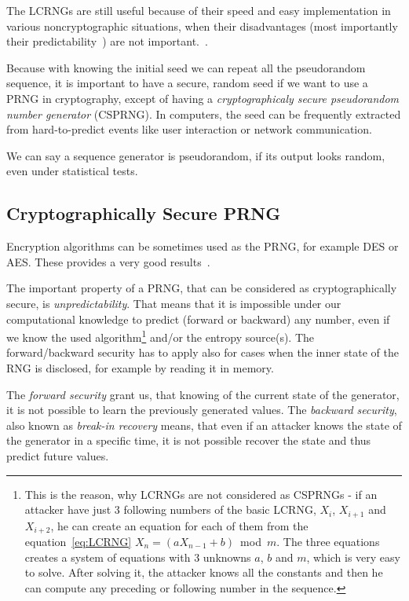The LCRNGs are still useful because of their speed and easy implementation in various noncryptographic situations, when their disadvantages (most importantly their predictability~\cite[p.~152, 153]{CryptographyAndNetworkSecurity}) are not important.~\cite[chapter~16.1]{AppliedCryptography}. 

Because with knowing the initial seed we can repeat all the pseudorandom sequence, it is important to have a secure, random seed if we want to use a PRNG in cryptography, except of having a {\em cryptographicaly secure pseudorandom number generator} (CSPRNG). In computers, the seed can be frequently extracted from hard-to-predict events like user interaction or network communication.

We can say a sequence generator is pseudorandom, if its output looks random, even under statistical tests.

\subsection{Cryptographically Secure PRNG}
Encryption algorithms can be sometimes used as the PRNG, for example DES or AES. These provides a very good results~\cite[p.~153-156]{CryptographyAndNetworkSecurity}.

The important property of a PRNG, that can be considered as cryptographically secure, is {\em unpredictability}. That means that it is impossible under our computational knowledge to predict (forward or backward) any number, even if we know the used algorithm\footnote{This is the reason, why LCRNGs are not considered as CSPRNGs - if an attacker have just 3 following numbers of the basic LCRNG, $X_{i}$, $X_{i+1}$ and $X_{i+2}$, he can create an equation for each of them from the equation~\ref{eq:LCRNG} $X_n = (aX_{n-1} + b)$~mod~$m$. The three equations creates a system of equations with 3 unknowns $a$, $b$ and $m$, which is very easy to solve. After solving it, the attacker knows all the constants and then he can compute any preceding or following number in the sequence.} and/or the entropy source(s). The forward/backward security has to apply also for cases when the inner state of the RNG is disclosed, for example by reading it in memory.

The {\em forward security} grant us, that knowing of the current state of the generator, it is not possible to learn the previously generated values. The {\em backward security}, also known as {\em break-in recovery}  means, that even if an attacker knows the state of the generator in a specific time, it is not possible recover the state and thus predict future values.

